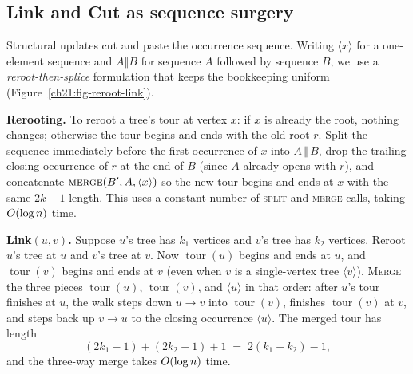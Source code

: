 \subsection{Link and Cut as sequence surgery}

Structural updates cut and paste the occurrence sequence. Writing $\langle x\rangle$ for a one-element sequence and $A \mathbin{\Vert} B$ for sequence $A$ followed by sequence $B$, we use a
\emph{reroot-then-splice} formulation that keeps the bookkeeping uniform (Figure~\ref{ch21:fig-reroot-link}).

\textbf{Rerooting.} To reroot a tree's tour at vertex $x$: if $x$ is already the root,
nothing changes; otherwise the tour begins and ends with the old root $r$. Split the
sequence immediately before the first occurrence of $x$ into $A\,\Vert\,B$, drop the trailing
closing occurrence of $r$ at the end of $B$ (since $A$ already opens with $r$), and
concatenate $\textsc{merge}(B', A, \langle x\rangle)$ so the new tour begins and ends
at $x$ with the same $2k-1$ length. This uses a constant number of \textsc{split} and \textsc{merge} calls, taking $O(\log n)$ time.

\textbf{Link$(u,v)$.} Suppose $u$'s tree has $k_1$ vertices and $v$'s tree has $k_2$ vertices. Reroot $u$'s tree at $u$ and $v$'s tree at $v$. Now $\operatorname{tour}(u)$
begins and ends at $u$, and $\operatorname{tour}(v)$ begins and ends at $v$ (even when $v$
is a single-vertex tree $\langle v\rangle$). \textsc{Merge} the three pieces $\operatorname{tour}(u)$,
$\operatorname{tour}(v)$, and $\langle u\rangle$ in that order: after $u$'s tour finishes at $u$, the walk steps
down $u\!\to\!v$ into $\operatorname{tour}(v)$, finishes $\operatorname{tour}(v)$ at $v$, and steps back
up $v\!\to\!u$ to the closing occurrence $\langle u\rangle$. The merged tour has length
\[
(2k_1-1) + (2k_2-1) + 1 \;=\; 2(k_1+k_2) - 1,
\]
and the three-way merge takes $O(\log n)$ time.

